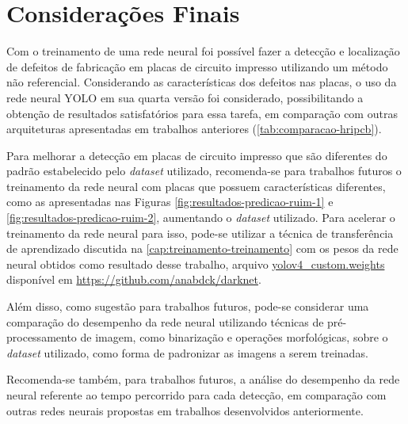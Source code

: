 \chapter{Considerações Finais}
Com o treinamento de uma rede neural foi possível fazer a detecção e localização de defeitos de fabricação em placas de circuito impresso utilizando um método não referencial. Considerando as características dos defeitos nas placas, o uso da rede neural YOLO em sua quarta versão foi considerado, possibilitando a obtenção de resultados satisfatórios para essa tarefa, em comparação com outras arquiteturas apresentadas em trabalhos anteriores (\autoref{tab:comparacao-hripcb}).

Para melhorar a detecção em placas de circuito impresso que são diferentes do padrão estabelecido pelo \textit{dataset} utilizado, recomenda-se para trabalhos futuros o treinamento da rede neural com placas que possuem características diferentes, como as apresentadas nas Figuras \ref{fig:resultados-predicao-ruim-1} e \ref{fig:resultados-predicao-ruim-2}, aumentando o \textit{dataset} utilizado.  Para acelerar o treinamento da rede neural para isso, pode-se utilizar a técnica de transferência de aprendizado discutida na \autoref{cap:treinamento-treinamento} com os pesos da rede neural obtidos como resultado desse trabalho, arquivo \url{yolov4_custom.weights} disponível em \url{https://github.com/anabdck/darknet}.

Além disso, como sugestão para trabalhos futuros, pode-se considerar uma comparação do desempenho da rede neural utilizando técnicas de pré-processamento de imagem, como binarização e operações morfológicas, sobre o \textit{dataset} utilizado, como forma de padronizar as imagens a serem treinadas.

Recomenda-se também, para trabalhos futuros, a análise do desempenho da rede neural referente ao tempo percorrido para cada detecção, em comparação com outras redes neurais propostas em trabalhos desenvolvidos anteriormente.
